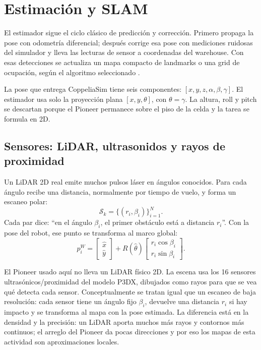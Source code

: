 \chapter{Estimación y SLAM}

El estimador sigue el ciclo clásico de predicción y corrección. Primero propaga
la pose con odometría diferencial; después corrige esa pose con mediciones
ruidosas del simulador y lleva las lecturas de sensor a coordenadas del
warehouse. Con esas detecciones se actualiza un mapa compacto de landmarks o una
grid de ocupación, según el algoritmo seleccionado \cite{thrun2005}.

La pose que entrega CoppeliaSim tiene seis componentes:
\([x,y,z,\alpha,\beta,\gamma]\). El estimador usa solo la proyección plana
\([x,y,\theta]\), con \(\theta=\gamma\). La altura, roll y pitch se descartan
porque el Pioneer permanece sobre el piso de la celda y la tarea se formula en
2D.

\section{Sensores: LiDAR, ultrasonidos y rayos de proximidad}

Un LiDAR 2D real emite muchos pulsos láser en ángulos conocidos. Para cada ángulo
recibe una distancia, normalmente por tiempo de vuelo, y forma un escaneo polar:
\[
\mathcal{S}_k=\{(r_i,\beta_i)\}_{i=1}^{N}.
\]
Cada par dice: ``en el ángulo \(\beta_i\), el primer obstáculo está a distancia
\(r_i\)''. Con la pose del robot, ese punto se transforma al marco global:
\[
p_i^W =
\begin{bmatrix}\hat{x}\\\hat{y}\end{bmatrix}+
R(\hat{\theta})
\begin{bmatrix}
r_i\cos\beta_i\\
r_i\sin\beta_i
\end{bmatrix}.
\]

El Pioneer usado aquí no lleva un LiDAR físico 2D. La escena usa los 16 sensores
ultrasónicos/proximidad del modelo P3DX, dibujados como rayos para que se vea
qué detecta cada sensor. Conceptualmente se tratan igual que un escaneo de baja
resolución: cada sensor tiene un ángulo fijo \(\beta_i\), devuelve una distancia
\(r_i\) si hay impacto y se transforma al mapa con la pose estimada. La
diferencia está en la densidad y la precisión: un LiDAR aporta muchos más rayos
y contornos más continuos; el arreglo del Pioneer da pocas direcciones y por eso
los mapas de esta actividad son aproximaciones locales.

